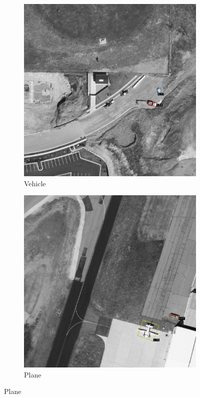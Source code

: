 \begin{figure}[h!]
    \begin{subfigure}[t]{0.38\textwidth}
        \centering
        \includegraphics[width=\linewidth]{images/015Results/03ablation/comp_images/red/427.png}
        \caption{Vehicle}
    \end{subfigure}
    \begin{subfigure}[t]{0.38\textwidth}
        \centering
        \includegraphics[width=\linewidth]{images/015Results/03ablation/comp_images/red/487.png}
        \caption{Plane}
    \end{subfigure}
    

\end{figure}
